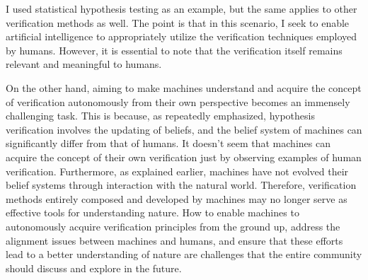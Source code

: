 I used statistical hypothesis testing as an example, but the same applies to other verification methods as well. The point is that in this scenario, I seek to enable artificial intelligence to appropriately utilize the verification techniques employed by humans. However, it is essential to note that the verification itself remains relevant and meaningful to humans.

On the other hand, aiming to make machines understand and acquire the concept of verification autonomously from their own perspective becomes an immensely challenging task. This is because, as repeatedly emphasized, hypothesis verification involves the updating of beliefs, and the belief system of machines can significantly differ from that of humans. It doesn't seem that machines can acquire the concept of their own verification just by observing examples of human verification. Furthermore, as explained earlier, machines have not evolved their belief systems through interaction with the natural world. Therefore, verification methods entirely composed and developed by machines may no longer serve as effective tools for understanding nature. How to enable machines to autonomously acquire verification principles from the ground up, address the alignment issues between machines and humans, and ensure that these efforts lead to a better understanding of nature are challenges that the entire community should discuss and explore in the future.


